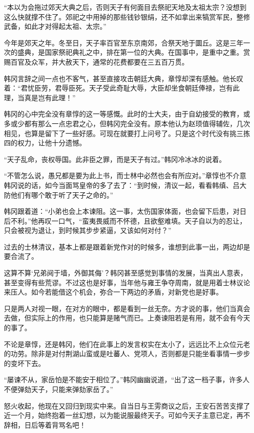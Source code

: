 “本以为会拖过郊天大典之后，否则天子有何面目去祭祀天地及太祖太宗？没想到这么快就撑不住了。郊祀之中用掉的那些钱钞银绢，还不如拿出来犒赏军民，整修武备，如此才对得起太祖、太宗。”

今年是郊天之年。冬至日，天子率百官至东京南郊，合祭天地于圜丘。这是三年一次的盛典，是国家祭祀典礼之中，排在第一位的大典。在国事中，是重中之重。赏赐百官及众军，并大赦天下，通常的花费都要在三五百万贯。

韩冈言辞之间一点也不客气，甚至直接攻击朝廷大典，章惇却深有感触。他长叹着：“君忧臣劳，君辱臣死。天子受此奇耻大辱，大臣却坐食朝廷俸禄，岂有此理，当真是岂有此理！”

韩冈的心中完全没有章惇的这一等感慨。此时的士大夫，由于自幼接受的教育，或多或少都有那么一点忠君之心，但韩冈完全没有。原本他认为赵顼值得辅佐，几次相见，也算是留下了一些好感。可现在就要打上问号了。只是这个时代没有挑三拣四的权力，让他十分遗憾。

“天子乱命，丧权辱国。此非臣之罪，而是天子有过。”韩冈冷冰冰的说着。

“不管怎么说，愚兄都是要为此上书，而士林中必然也会有所应对。”章惇也不介意韩冈说的话，如今当面骂皇帝的多了去了：“到时候，清议一起，看看韩缜、吕大防他们有哪个敢于听了天子之命的。”

韩冈跟着道：“小弟也会上本谏阻。这一事，太伤国家体面，也会留下后患，对日后不利。”他再叹一口气，“蛮夷畏威而不怀德，且欲壑难填。天子自以为的忍让，只会被视为退让，到时候其步步紧逼，又该如何对付？”

过去的士林清议，基本上都是跟着新党作对的时候多，谁想到此事一出，两边却是要合流了。

这算不算‘兄弟阋于墙，外御其侮’？韩冈甚至感觉到事情的发展，当真出人意表，甚至变得有些荒谬。不过这也是好事，当年他与雍王争夺周南，就是用着士林议论来压人。如今若能借这个机会，弥合一下两边的矛盾，对新党也是好事。

只是两人对视一眼，在对方的眼中，都是看到一丝无奈。方才说的事，他们当真会去做，但实际上的作用，也只能算是赌气而已。上奏谏阻若是有用，就不会有今天的事了。

不论是章惇，还是韩冈，他们在此事上的发言权实在太小了，远远比不上众位元老的功劳。除非是对付荆湖山蛮或是吐蕃人、党项人，否则都是只能坐看事情一步步的变坏下去。

“屡谏不从，家岳怕是不能安于相位了。”韩冈幽幽说道，“出了这一档子事，许多人不便弹劾天子，只能来弹劾家岳了。”

怒火收起，他现在又回归到现实中来。自当日与王雱商议之后，王安石苦苦支撑了近一个月，始终抱着一丝幻想，以为能说服最终天子。可如今天子主意已定，再不辞相，日后等着背骂名吧！

